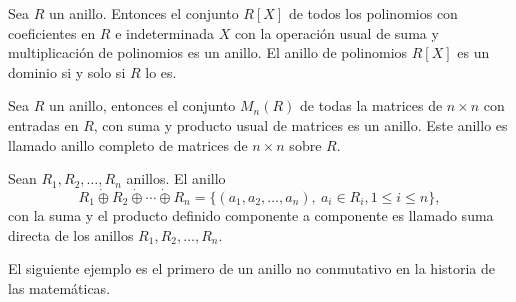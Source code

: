 \begin{ejemplo}
Sea $R$ un anillo. Entonces el conjunto $R[X]$ de todos los polinomios con coeficientes en $R$ e indeterminada  $X$ con la operación usual de suma y multiplicación de polinomios es un anillo. El anillo de polinomios $R[X]$ es un dominio si y solo si $R$ lo es. 
\end{ejemplo}
\begin{ejemplo}
Sea $R$ un anillo, entonces el conjunto $M_n(R)$ de todas la matrices de $n\times n$ con entradas en $R$, con suma y producto usual de matrices es un anillo. Este anillo es llamado anillo completo de matrices de $n\times n$ sobre $R$.
\end{ejemplo}
\begin{ejemplo}
Sean $R_1, R_2, \dots, R_n$ anillos. El anillo \[ R_1\dot{\oplus}R_2\dot{\oplus}\cdots\dot{\oplus} R_n = \{ (a_1,a_2,\dots,a_n),\   a_i \in R_i, 1\leq i \leq n \},  \] con la suma y el producto definido componente a componente es llamado  suma directa de los anillos $R_1, R_2,\dots,R_n$.
\end{ejemplo}
El siguiente ejemplo es el primero de un anillo no conmutativo en la historia de las matemáticas. 
